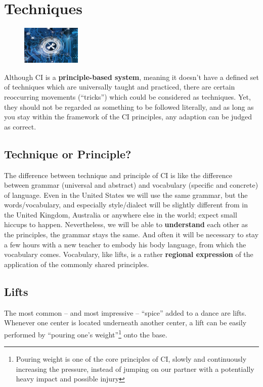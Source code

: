 \chapter{Techniques}\label{ch:techniques}

\begin{figure}
    \centering
    \includegraphics[width=0.25\textwidth]{images/techniques}
\end{figure}

Although CI is a \textbf{principle-based system}, meaning it doesn't have a defined set of techniques which are universally taught and practiced, there are certain reoccurring movements (``tricks'') which could be considered as techniques.
Yet, they should not be regarded as something to be followed literally, and as long as you stay within the framework of the CI principles, any adaption can be judged as correct.

\section{Technique or Principle?}\label{sec:technique-or-principle?}

The difference between technique and principle of CI is like the difference between grammar (universal and abstract) and vocabulary (specific and concrete) of language.
Even in the United States we will use the same grammar, but the words/vocabulary, and especially style/dialect will be slightly different from in the United Kingdom, Australia or anywhere else in the world; expect small hiccups to happen.
Nevertheless, we will be able to \textbf{understand} each other as the principles, the grammar stays the same.
And often it will be necessary to stay a few hours with a new teacher to embody his body language, from which the vocabulary comes.
Vocabulary, like lifts, is a rather \textbf{regional expression} of the application of the commonly shared principles.

\section{Lifts}\label{sec:lifts}

The most common -- and most impressive -- ``spice'' added to a dance are lifts.
Whenever one center is located underneath another center, a lift can be easily performed by ``pouring one's weight''\footnote{Pouring weight is one of the core principles of CI, slowly and continuously increasing the pressure, instead of jumping on our partner with a potentially heavy impact and possible injury} onto the base.

